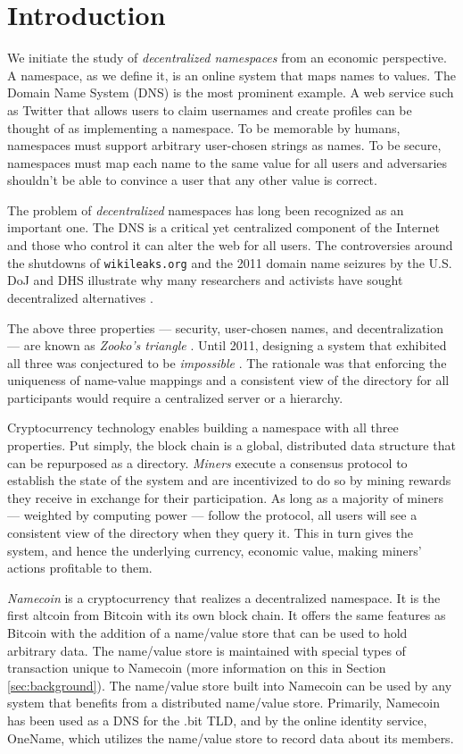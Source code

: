 \section{Introduction}
\label{sec:intro}

We initiate the study of {\em decentralized namespaces} from an economic perspective. A namespace, as we define it, is an online system that maps names to values. The Domain Name System (DNS) is the most prominent example.  A web service such as Twitter that allows users to claim usernames and create profiles can be thought of as implementing a namespace. To be memorable by humans, namespaces must support arbitrary user-chosen strings as names. To be secure, namespaces must map each name to the same value for all users and adversaries shouldn't be able to convince a user that any other value is correct.

The problem of {\em decentralized} namespaces has long been recognized as an important one. The DNS is a critical yet centralized component of the Internet and those who control it can alter the web for all users. The controversies around the shutdowns of {\tt wikileaks.org} and the 2011 domain name seizures by the U.S. DoJ and DHS illustrate why many researchers and activists have sought decentralized alternatives \cite{wikileaks}.

The above three properties --- security, user-chosen names, and decentralization --- are known as {\em Zooko's triangle} \cite{zooko}. Until 2011, designing a system that exhibited all three was conjectured to be {\em impossible} \cite{square}. The rationale was that enforcing the uniqueness of name-value mappings and a consistent view of the directory for all participants would require a centralized server or a hierarchy.

Cryptocurrency technology enables building a namespace with all three properties. Put simply, the block chain is a global, distributed data structure that can be repurposed as a directory. {\em Miners} execute a consensus protocol to establish the state of the system and are incentivized to do so by mining rewards they receive in exchange for their participation. As long as a majority of miners --- weighted by computing power --- follow the protocol, all users will see a consistent view of the directory when they query it. This in turn gives the system, and hence the underlying currency, economic value, making miners' actions profitable to them.

{\em Namecoin} is a cryptocurrency that realizes a decentralized namespace. It is the first altcoin from Bitcoin with its own block chain. It offers the same features as Bitcoin with the addition of a name/value store that can be used to hold arbitrary data. The name/value store is maintained with special types of transaction unique to Namecoin (more information on this in Section \ref{sec:background}). The name/value store built into Namecoin can be used by any system that benefits from a distributed name/value store. Primarily, Namecoin has been used as a DNS for the .bit TLD, and by the online identity service, OneName, which utilizes the name/value store to record data about its members.

